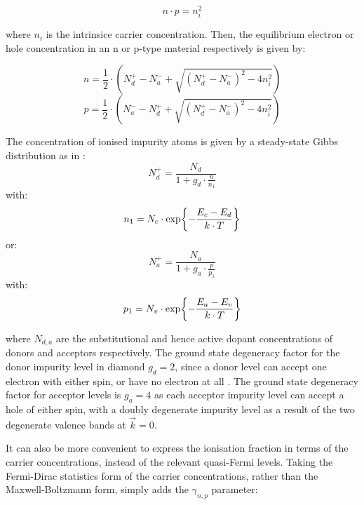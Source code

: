 \begin{refsection}
\begin{equation}
    n\cdot p = n^{2}_{i}
    \label{eq:intrinsic_carriers_3.69_tesfaye}
\end{equation}

where $n_{i}$ is the intrinsice carrier concentration. Then, the equilibrium electron or hole concentration in an n or p-type material respectively is given by:

\begin{equation}
    n=\frac{1}{2}\cdot\left(N^{+}_{d}-N^{-}_{a}+\sqrt{\left(N^{+}_{d}-N^{-}_{a}\right)^{2}-4n^{2}_{i}}\right)
    \label{eq:equilibrium_electron_concentration_3.121_tesfaye}
\end{equation}
\begin{equation}
    p=\frac{1}{2}\cdot\left(N^{-}_{a}-N^{+}_{d}+\sqrt{\left(N^{+}_{d}-N^{-}_{a}\right)^{2}-4n^{2}_{i}}\right)
\end{equation}

The concentration of ionised impurity atoms is given by a steady-state Gibbs distribution as in \cite{tcadmanual2001}:
\begin{equation}
    N^{+}_{d} = \frac{N_{d}}{1+g_{d}\cdot\frac{n}{n_{1}}}
    \label{eq:incomplete_ionisation_donors}
\end{equation}
with: 
\begin{equation}
    n_{1}=N_{c}\cdot\exp{-\frac{E_{c}-E_{d}}{k\cdot T}}
    \label{eq:n_{1}_gibbs_distribution}
\end{equation}
or:
\begin{equation}
    N^{+}_{a} = \frac{N_{a}}{1+g_{a}\cdot\frac{p}{p_{1}}}
    \label{eq:incomplete_ionisation_acceptors}
\end{equation}
with:
\begin{equation}
    p_{1}=N_{v}\cdot\exp{-\frac{E_{a}-E_{v}}{k\cdot T}}
    \label{eq:p_{1}_gibbs_distribution}
\end{equation}

where $N_{d,a}$ are the substitutional and hence active dopant concentrations of donors and acceptors respectively. The ground state degeneracy factor for the donor impurity level in diamond $g_{d} = 2$, since a donor level can accept one electron with either spin, or have no electron at all \cite{koizumi2018:ch2}. The ground state degeneracy factor for acceptor levels is $g_{a}=4$ as each acceptor impurity level can accept a hole of either spin, with a doubly degenerate impurity level as a result of the two degenerate valence bands at $\Vec{k}=0$.

It can also be more convenient to express the ionisation fraction in terms of the carrier concentrations, instead of the relevant quasi-Fermi levels. Taking the Fermi-Dirac statistics form of the carrier concentrations, rather than the Maxwell-Boltzmann form, simply adds the $\gamma_{n,p}$ parameter:


\end{refsection}
